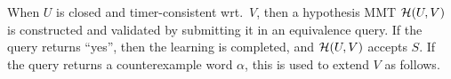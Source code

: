 When $U$ is closed and timer-consistent wrt.\ $V$, then
    a hypothesis MMT $\mathcal{H}(U,V)$ is constructed and
    validated by submitting it in an equivalence query.
    If the query returns ``yes'', then
    the learning is completed, and $\mathcal{H}(U,V)$ accepts $S$.
    If the query returns a counterexample word $\alpha$, this is used to extend
    $V$ as follows.





